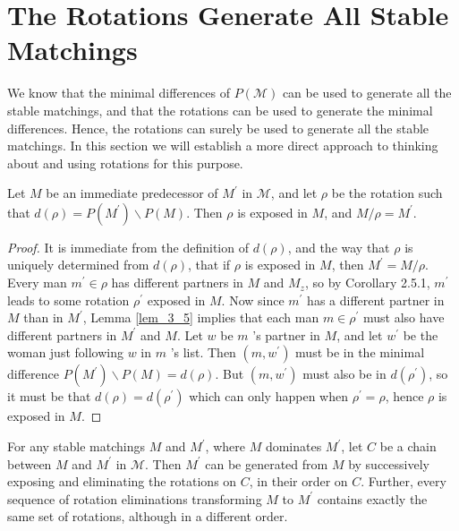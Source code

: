 
\section{The Rotations Generate All Stable Matchings}
We know that the minimal differences of $P(\mathcal{M})$ can be used to generate all the stable matchings, and that the rotations can be used to generate the minimal differences. Hence, the rotations can surely be used to generate all the stable matchings. In this section we will establish a more direct approach to thinking about and using rotations for this purpose.

\begin{lemma}\label{lem_3_7}
    Let $M$ be an immediate predecessor of $M^{\prime}$ in $\mathcal{M}$, and let $\rho$ be the rotation such that $d(\rho)=P\left(M^{\prime}\right) \backslash P(M)$. Then $\rho$ is exposed in $M$, and $M / \rho=M^{\prime}$.
\end{lemma}

\begin{proof}
    It is immediate from the definition of $d(\rho)$, and the way that $\rho$ is uniquely determined from $d(\rho)$, that if $\rho$ is exposed in $M$, then $M^{\prime}=M / \rho$. Every man $m^{\prime} \in \rho$ has different partners in $M$ and $M_z$, so by Corollary 2.5.1, $m^{\prime}$ leads to some rotation $\rho^{\prime}$ exposed in $M$. Now since $m^{\prime}$ has a different partner in $M$ than in $M^{\prime}$, Lemma \ref{lem_3_5} implies that each man $m \in \rho^{\prime}$ must also have different partners in $M^{\prime}$ and $M$. Let $w$ be $m$ 's partner in $M$, and let $w^{\prime}$ be the woman just following $w$ in $m$ 's list. Then $\left(m, w^{\prime}\right)$ must be in the minimal difference $P\left(M^{\prime}\right) \backslash P(M)=d(\rho)$. But $\left(m, w^{\prime}\right)$ must also be in $d\left(\rho^{\prime}\right)$, so it must be that $d(\rho)=d\left(\rho^{\prime}\right)$ which can only happen when $\rho^{\prime}=\rho$, hence $\rho$ is exposed in $M$.
\end{proof}

\begin{corollary}\label{cor_3_2}
    For any stable matchings $M$ and $M^{\prime}$, where $M$ dominates $M^{\prime}$, let $C$ be a chain between $M$ and $M^{\prime}$ in $\mathcal{M}$. Then $M^{\prime}$ can be generated from $M$ by successively exposing and eliminating the rotations on $C$, in their order on $C$. Further, every sequence of rotation eliminations transforming $M$ to $M^{\prime}$ contains exactly the same set of rotations, although in a different order.
\end{corollary}

